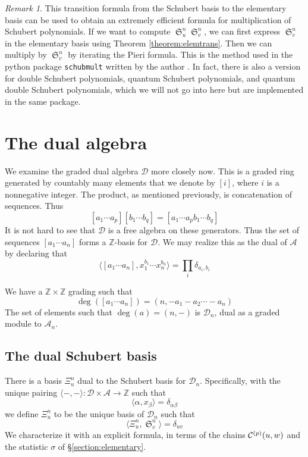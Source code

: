 \documentclass{amsart}
\theoremstyle{definition}
\theoremstyle{remark}
\newtheorem*{remark}{Remark}
\numberwithin{equation}{subsection}
\DeclareMathOperator{\sch}{\mathfrak{S}}
\newcommand{\dsch}{\ensuremath{\Xi}}
\newcommand{\coma}{\mathcal{A}}
\newcommand{\dcoma}{\mathcal{D}}
\begin{document}
\begin{remark}
This transition formula from the Schubert basis to the elementary basis can be used to obtain an extremely efficient formula for multiplication of Schubert polynomials. If we want to compute $\sch_u^n\sch_v^n$, we can first express $\sch_v^n$ in the elementary basis using Theorem \ref{theorem:elemtrans}. Then we can multiply by $\sch_v^n$ by iterating the Pieri formula. This is the method used in the python package \verb|schubmult| written by the author \cite{schubmult}. In fact, there is also a version for double Schubert polynomials, quantum Schubert polynomials, and quantum double Schubert polynomials, which we will not go into here but are implemented in the same package.
\end{remark}




\section{The dual algebra}\label{section:dualalgebra}

We examine the graded dual algebra $\dcoma$ more closely now. This is a graded ring generated by countably many elements that we denote by $[i]$, where $i$ is a nonnegative integer. The product, as mentioned previously, is concatenation of sequences. Thus
$$[a_1\cdots a_p][b_1\cdots b_q]=[a_1\cdots a_pb_1\cdots b_q]$$
It is not hard to see that $\dcoma$ is a free algebra on these generators. Thus the set of sequences $[a_1\cdots a_n]$ forms a $\mathbb{Z}$-basis for $\dcoma$. We may realize this as the dual of $\coma$ by declaring that
$$\langle [a_1\cdots a_n],x_1^{b_1}\cdots x_n^{b_n}\rangle = \prod_i\delta_{a_i,b_i}$$

We have a $\mathbb{Z}\times \mathbb{Z}$ grading such that
$$\deg([a_1\cdots a_n])=(n,-a_1-a_2\cdots-a_n)$$
The set of elements such that $\deg(a) = (n,-)$ is $\dcoma_n$, dual as a graded module to $\coma_n$.

\subsection{The dual Schubert basis}
       
There is a basis $\dsch_u^{n}$ dual to the Schubert basis for $\dcoma_n$. Specifically, with the unique pairing $\langle -,-\rangle:\dcoma\times \coma\to\mathbb{Z}$ such that
$$\langle \alpha,x_\beta\rangle = \delta_{\alpha\beta}$$
we define $\dsch_u^n$ to be the unique basis of $\dcoma_n$ such that
$$\langle \dsch_u^n,\sch_v^n\rangle = \delta_{uv}$$
We characterize it with an explicit formula, in terms of the chains $\mathcal{C}^{(p)}(u,w)$ and the statistic $\sigma$ of \S\ref{section:elementary}.
\end{document}
